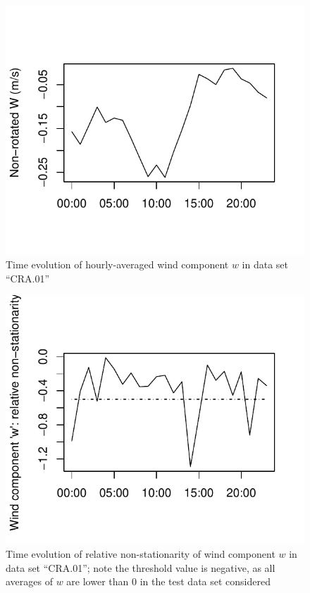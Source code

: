 \documentclass[a4paper,10pt]{book}
\begin{document}
\begin{figure}[htp]
 \centering
 \begin{center}
 \includegraphics[scale=1.1,keepaspectratio=true]{./diagrams/average_sonic_file_set_0.pdf}
 \end{center}
 \caption{Time evolution of hourly-averaged wind component $w$ in data set ``CRA.01''}
 \label{fig:average.sonic.file.set.0}
\end{figure}

\begin{figure}[htp]
 \centering
 \begin{center}
 \includegraphics[scale=1.1,keepaspectratio=true]{./diagrams/average_sonic_file_set_1.pdf}
 \end{center}
 \caption{Time evolution of relative non-stationarity of wind component $w$ in data set ``CRA.01''; note the threshold value is negative, as all averages of $w$ are lower than 0 in the test data set considered}
 \label{fig:average.sonic.file.set.1}
\end{figure}
\end{document}
